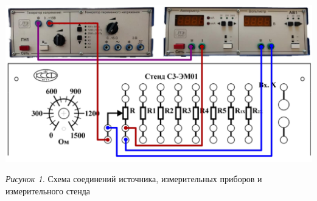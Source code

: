 \hypertarget{schema1}{}

\begin{center}
    \includegraphics[width=15cm]{images/schema1}

    \smallvspace

    \textit{Рисунок 1.} Схема соединений источника, измерительных приборов и
    измерительного стенда
\end{center}




